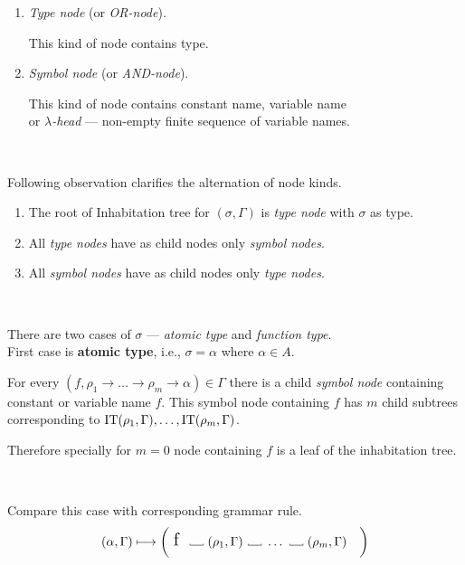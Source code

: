 \documentclass[12pt,a4paper]{report}
\newcommand\Vtextvisiblespace[1][.3em]{%
  \mbox{\kern.06em\vrule height.3ex}%
  \vbox{\hrule width#1}%
  \hbox{\vrule height.3ex}}
\begin{document}
\begin{samepage}
\begin{enumerate}
  \item \textit{Type node} (or \textit{OR-node}).
  
  	    This kind of node contains type. %
  \item \textit{Symbol node} (or \textit{AND-node}).
  
  		This kind of node contains 
  		constant name, variable name 
  		\\or \textit{$\lambda$-head} 
  	    --- non-empty finite sequence of variable names. 
\end{enumerate}
\end{samepage}~

Following observation clarifies the alternation of node kinds.
\begin{enumerate}
\item The root of Inhabitation tree for $(\sigma,\Gamma)$ is 
      \textit{type node} with $\sigma$ as type.
\item All \textit{type nodes} have as child nodes only \textit{symbol nodes}. 
\item All \textit{symbol nodes} have as child nodes only \textit{type nodes}. 
\end{enumerate}~



There are two cases of $\sigma$ --- 
\textit{atomic type} and \textit{function type}. \\

First case is \textbf{atomic type}, i.e., $\sigma = \alpha$ where $\alpha \in A$.

For every $(f,\rho_1 \rightarrow \dots \rightarrow \rho_m \rightarrow \alpha) \in \Gamma$
there is a child \textit{symbol node} containing constant or variable name $f$.
This symbol node containing $f$ has $m$ child subtrees corresponding to  
$\mathop{\mathrm{IT}}(\rho_1,\Gamma),\dots,\mathop{\mathrm{IT}}(\rho_m,\Gamma)$.  

Therefore specially for $m = 0$ node containing $f$ is 
a leaf of the inhabitation tree.

~

Compare this case with corresponding grammar rule.
\[ 
	( \alpha , \Gamma )  \gar
	\bigg( \mbox{ {\Large f }}
	  \mbox{ \Vtextvisiblespace[1em] } 
	  ( \rho_1 , \Gamma )
	  \mbox{ \Vtextvisiblespace[1em] } 
	  \dots
	  \mbox{ \Vtextvisiblespace[1em] } 
	  ( \rho_m , \Gamma )
	  \quad \bigg)
\]
\end{document}
